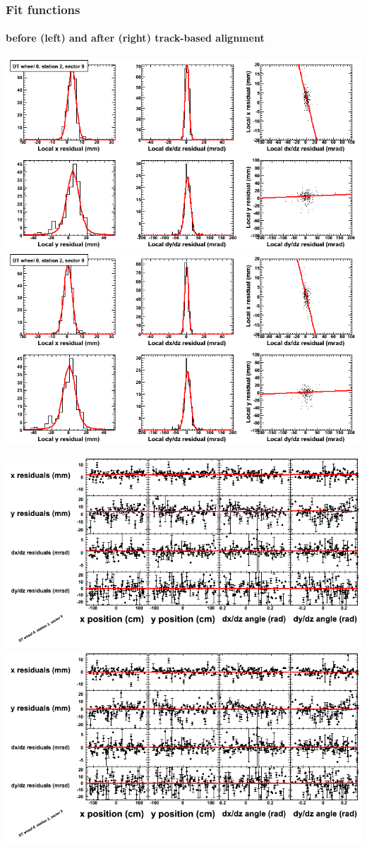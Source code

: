 \documentclass[compress]{beamer}
\begin{document}
\begin{frame}
\frametitle{Fit functions}
\framesubtitle{before (left) and after (right) track-based alignment}
\includegraphics[width=0.5\linewidth]{fitfunctions_re01/MBwhCst2sec09_bellcurves.png} \includegraphics[width=0.5\linewidth]{fitfunctions_re05/MBwhCst2sec09_bellcurves.png}

\includegraphics[width=0.5\linewidth]{fitfunctions_re01/MBwhCst2sec09_polynomials.png} \includegraphics[width=0.5\linewidth]{fitfunctions_re05/MBwhCst2sec09_polynomials.png}
\end{frame}
\end{document}
